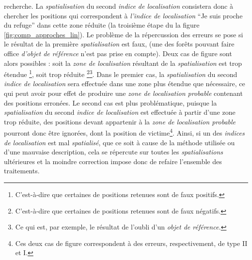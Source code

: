recherche. La \emph{spatialisation} du second \emph{indice de
  localisation} consistera donc à chercher les positions qui
correspondent à \emph{l'indice de localisation} \enquote{Je suis
  proche du refuge} dans cette zone réduite (\ie la troisième étape du
la figure \ref{fig:comp_approches_lin}). Le problème de la
répercussion des erreurs se pose si le résultat de la première
\emph{spatialisation} est faux, (\eg une des forêts pouvant faire
office \emph{d'objet de référence} n'est pas prise en compte). Deux
cas de figure sont alors possibles : soit la \emph{zone de
  localisation} résultant de la \emph{spatialisation} est trop étendue
\footnote{C'est-à-dire que certaines de positions retenues sont de
  faux positifs.}, soit trop réduite \footnote{C'est-à-dire que
  certaines de positions retenues sont de faux
  négatifs.}\multiplefootnoteseparator \footnote{Ce qui est, par
  exemple, le résultat de l'oubli d'un \emph{objet de référence.}}.
Dans le premier cas, la \emph{spatialisation} du second \emph{indice
  de localisation} sera effectuée dans une zone plus étendue que
nécessaire, ce qui peut avoir pour effet de produire une \emph{zone de
  localisation probable} contenant des positions erronées. Le second
cas est plus problématique, puisque la \emph{spatialisation} du second
\emph{indice de localisation} est effectuée à partir d'une zone trop
réduite, des positions devant appartenir à la \emph{zone de
  localisation probable} pourront donc être ignorées, dont la position
de victime\footnote{Ces deux cas de figure correspondent à des
  erreurs, respectivement, de type II et I.}. Ainsi, si un des
\emph{indices de localisation} est mal \emph{spatialisé}, que ce soit
à cause de la méthode utilisée ou d'une mauvaise description, cela se
répercute sur toutes les \emph{spatialisations} ultérieures et la
moindre correction impose donc de refaire l'ensemble des traitements.

